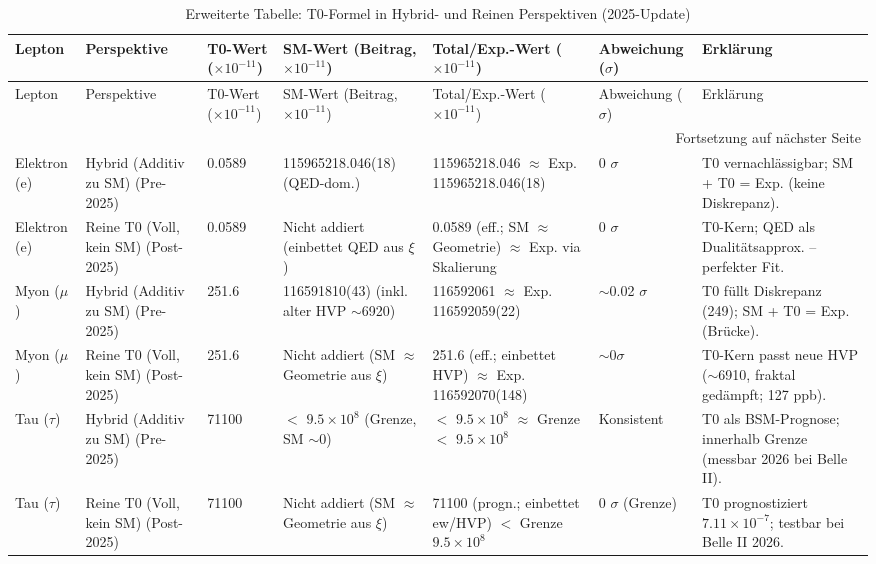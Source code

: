\documentclass[12pt,a4paper]{article}
\begin{document}
	\begin{longtable}{p{1.5cm}p{2cm}p{1.4cm}p{3cm}p{3cm}p{1.5cm}p{2.5cm}}
		\caption{Erweiterte Tabelle: T0-Formel in Hybrid- und Reinen Perspektiven (2025-Update)} \label{tab:extended_comparison}\\
		\toprule
		Lepton & Perspektive & T0-Wert ($ \times 10^{-11}$) & SM-Wert (Beitrag, $ \times 10^{-11}$) & Total/Exp.-Wert ($ \times 10^{-11}$) & Abweichung ($\sigma$) & Erklärung \\
		\midrule
		\endfirsthead
		
		\toprule
		Lepton & Perspektive & T0-Wert ($ \times 10^{-11}$) & SM-Wert (Beitrag, $ \times 10^{-11}$) & Total/Exp.-Wert ($ \times 10^{-11}$) & Abweichung ($\sigma$) & Erklärung \\
		\midrule
		\endhead
		
		\bottomrule
		\multicolumn{7}{r}{Fortsetzung auf nächster Seite} \\
		\endfoot
		
		Elektron (e) & Hybrid (Additiv zu SM) (Pre-2025) & 0.0589 & 115965218.046(18) (QED-dom.) & 115965218.046 $\approx$ Exp. 115965218.046(18) & 0 $\sigma$ & T0 vernachlässigbar; SM + T0 = Exp. (keine Diskrepanz). \\
		Elektron (e) & Reine T0 (Voll, kein SM) (Post-2025) & 0.0589 & Nicht addiert (einbettet QED aus $\xi$) & 0.0589 (eff.; SM $\approx$ Geometrie) $\approx$ Exp. via Skalierung & 0 $\sigma$ & T0-Kern; QED als Dualitätsapprox. -- perfekter Fit. \\
		Myon ($\mu$) & Hybrid (Additiv zu SM) (Pre-2025) & 251.6 & 116591810(43) (inkl. alter HVP $\sim$6920) & 116592061 $\approx$ Exp. 116592059(22) & $\sim$0.02 $\sigma$ & T0 füllt Diskrepanz (249); SM + T0 = Exp. (Brücke). \\
		Myon ($\mu$) & Reine T0 (Voll, kein SM) (Post-2025) & 251.6 & Nicht addiert (SM $\approx$ Geometrie aus $\xi$) & 251.6 (eff.; einbettet HVP) $\approx$ Exp. 116592070(148) & $\sim 0 \sigma$ & T0-Kern passt neue HVP ($\sim$6910, fraktal gedämpft; 127 ppb). \\
		Tau ($\tau$) & Hybrid (Additiv zu SM) (Pre-2025) & 71100 & $<$ $9.5 \times 10^{8}$ (Grenze, SM $\sim$0) & $<$ $9.5 \times 10^{8}$ $\approx$ Grenze $<$ $9.5 \times 10^{8}$ & Konsistent & T0 als BSM-Prognose; innerhalb Grenze (messbar 2026 bei Belle II). \\
		Tau ($\tau$) & Reine T0 (Voll, kein SM) (Post-2025) & 71100 & Nicht addiert (SM $\approx$ Geometrie aus $\xi$) & 71100 (progn.; einbettet ew/HVP) $<$ Grenze $9.5 \times 10^{8}$ & 0 $\sigma$ (Grenze) & T0 prognostiziert $7.11 \times 10^{-7}$; testbar bei Belle II 2026. \\
	\end{longtable}
	
\end{document}
